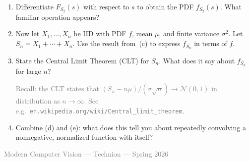 \documentclass[11pt,a4paper]{article}
\begin{document}
\begin{enumerate}[leftmargin=2em, itemsep=6pt]
\begin{enumerate}[label=(\alph*), itemsep=4pt]
    \item Differentiate $F_{S_2}(s)$ with respect to $s$ to obtain the PDF $f_{S_2}(s)$.
    What familiar operation appears?

    \item Now let $X_1, \ldots, X_n$ be IID with PDF $f$, mean $\mu$,
    and finite variance $\sigma^2$. Let $S_n = X_1 + \cdots + X_n$.
    Use the result from~(c) to express $f_{S_n}$ in terms of $f$.

    \item State the Central Limit Theorem (CLT) for $S_n$.
    What does it say about $f_{S_n}$ for large $n$?

    \textcolor{gray}{\small
    Recall: the CLT states that $(S_n - n\mu)/(\sigma\sqrt{n}) \to \mathcal{N}(0,1)$
    in distribution as $n \to \infty$.
    See e.g.\ \texttt{en.wikipedia.org/wiki/Central\_limit\_theorem}.}

    \item Combine (d) and (e): what does this tell you about
    repeatedly convolving a nonnegative, normalized function with itself?

  \end{enumerate}

\end{enumerate}

\vfill
\begin{center}
{\small\textcolor{gray}{Modern Computer Vision --- Technion --- Spring 2026}}
\end{center}
\end{document}

